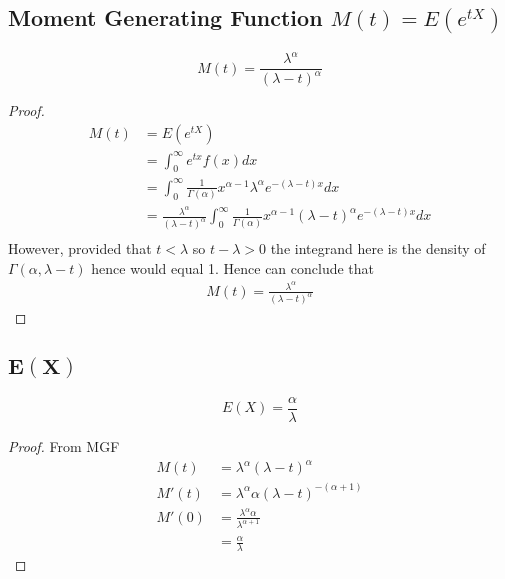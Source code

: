 \documentclass[12pt]{article}
\begin{document}
\subsection{Moment Generating Function $M(t)=E(e^{tX})$}

\begin{equation*}
    M(t)=\frac{\lambda^{\alpha}}{(\lambda -t)^{\alpha}}
\end{equation*}

\begin{proof}
  \begin{align*}
    M(t) &= E(e^{tX}) \\
         &= \int_{0}^{\infty} e^{tx}f(x) dx \\
         &=\int_{0}^{\infty}\frac{1}{\Gamma(\alpha)}x^{\alpha-1}\lambda^{\alpha}e^{-(\lambda -t)x} dx\\
         &=\frac{\lambda^{\alpha}}{(\lambda-t)^{\alpha}}\int_{0}^{\infty}\frac{1}{\Gamma(\alpha)}x^{\alpha-1}(\lambda-t)^{\alpha}e^{-(\lambda -t)x} dx\\
  \end{align*}
However, provided that $t<\lambda$ so $t-\lambda > 0$ the integrand here is the density of $\Gamma(\alpha,\lambda-t)$ hence would equal 1. Hence can conclude that
\begin{align*}
  M(t)=\frac{\lambda^{\alpha}}{(\lambda -t)^{\alpha}}
\end{align*}
\end{proof}

\subsection{$\bm{E(X)}$}

\begin{equation*}
  E(X) = \frac{\alpha}{\lambda}
\end{equation*}
\begin{proof} From MGF
  \begin{align*}
    M(t) &= \lambda^{\alpha}(\lambda-t)^{\alpha} \\
    M'(t) &= \lambda^{\alpha} \alpha (\lambda-t)^{-(\alpha+1)} \\
    M'(0) &= \frac{\lambda^{\alpha} \alpha}{\lambda^{\alpha+1}} \\
          &= \frac{\alpha}{\lambda}
  \end{align*}
\end{proof}
\end{document}
